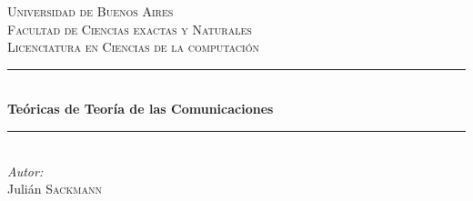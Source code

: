 \documentclass[]{article}
\begin{document}
\begin{titlepage}

\newcommand{\HRule}{\rule{\linewidth}{0.5mm}} %

\center %


\textsc{\LARGE Universidad de Buenos Aires}\\[1.5cm] %
\textsc{\Large Facultad de Ciencias exactas y Naturales}\\[0.5cm] %
\textsc{\large Licenciatura en Ciencias de la computación}\\[0.5cm] %


\HRule \\[0.4cm]
{ \huge \bfseries Teóricas de Teoría de las Comunicaciones}\\[0.4cm] %
\HRule \\[1.5cm]

%

\Large \emph{Autor:}\\
Julián \textsc{Sackmann}\\[2cm] %


\end{titlepage}
\end{document}
